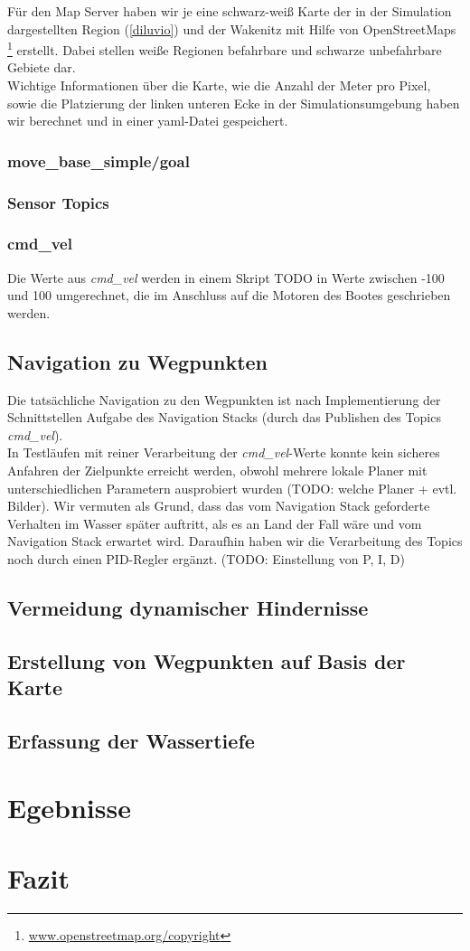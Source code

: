 \documentclass[conference]{IEEEtran}
\begin{document}
Für den Map Server haben wir je eine schwarz-weiß Karte der in der Simulation dargestellten Region (\ref{diluvio}) und der Wakenitz mit Hilfe von OpenStreetMaps \footnote{\url{www.openstreetmap.org/copyright}} erstellt. Dabei stellen weiße Regionen befahrbare und schwarze unbefahrbare Gebiete dar.\\
Wichtige Informationen über die Karte, wie die Anzahl der Meter pro Pixel, sowie die Platzierung der linken unteren Ecke in der Simulationsumgebung haben wir berechnet und in einer yaml-Datei gespeichert.

\subsubsection{move\_base\_simple/goal}
\subsubsection{Sensor Topics}
\subsubsection{cmd\_vel} \label{cmd}
Die Werte aus \textit{cmd\_vel} werden in einem Skript TODO in Werte zwischen -100 und 100 umgerechnet, die im Anschluss auf die Motoren des Bootes geschrieben werden.

\subsection{Navigation zu Wegpunkten}

Die tatsächliche Navigation zu den Wegpunkten ist nach Implementierung der Schnittstellen Aufgabe des Navigation Stacks (durch das Publishen des Topics \textit{cmd\_vel}).\\
In Testläufen mit reiner Verarbeitung der \textit{cmd\_vel}-Werte konnte kein sicheres Anfahren der Zielpunkte erreicht werden, obwohl mehrere lokale Planer mit unterschiedlichen Parametern ausprobiert wurden (TODO: welche Planer + evtl. Bilder). Wir vermuten als Grund, dass das vom Navigation Stack geforderte Verhalten im Wasser später auftritt, als es an Land der Fall wäre und vom Navigation Stack erwartet wird. Daraufhin haben wir die Verarbeitung des Topics noch durch einen PID-Regler ergänzt. (TODO: Einstellung von P, I, D)
\subsection{Vermeidung dynamischer Hindernisse}
\subsection{Erstellung von Wegpunkten auf Basis der Karte}
\subsection{Erfassung der Wassertiefe}

\section{Egebnisse}
\section{Fazit}
{}

\end{document}
